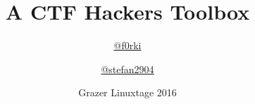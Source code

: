 \documentclass[english,xcolor={x11names,svgnames,dvipsnames}]{beamer}
\author{\href{https://twitter.com/f0rki}{@f0rki} \and \href{https://twitter.com/stefan2904}{@stefan2904}}
\title{A CTF Hackers Toolbox}
\subtitle{}
\date{Grazer Linuxtage 2016}
\begin{document}
\begin{frame}[t,plain]
    \titlepage
\end{frame}


\end{document}
